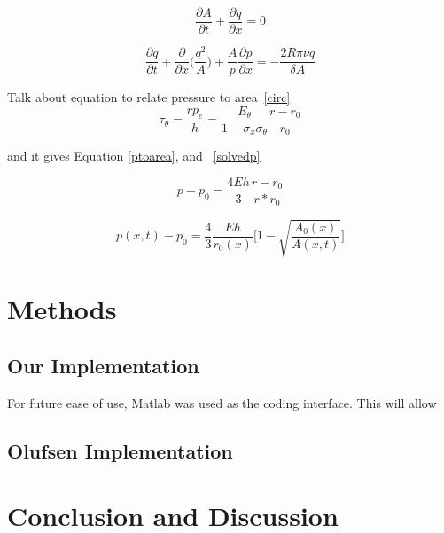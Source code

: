 \documentclass[12pt]{article}
\newcommand{\partder}[2]{\frac{\partial #1}{\partial #2}}
\begin{document}
\begin{equation}
	\label{continuity}
	\partder{A}{t} + \partder{q}{x} = 0
\end{equation}

\begin{equation}
	\label{consxmomentum}
	\partder{q}{t} + \partder{}{x}\Bigg(\frac{q^2}{A}\Bigg) + \frac{A}{p}\partder{p}{x} = -\frac{2R\pi \nu q}{\delta A}
\end{equation}

Talk about equation to relate pressure to area~\eqref{circ}
\begin{equation}
	\label{circ}
	\tau_\theta = \frac{r p_e}{h} = \frac{E_\theta}{1-\sigma_x\sigma_\theta}\frac{r-r_0}{r_0}
\end{equation}

and it gives Equation \eqref{ptoarea}, and ~\eqref{solvedp}

\begin{equation}
	\label{ptoarea}
	p-p_0 = \frac{4Eh}{3} \frac{r-r_0}{r*r_0}
\end{equation} 


\begin{equation}
	p(x,t) - p_0 = \frac{4}{3} \frac{Eh}{r_0(x)} \Bigg[1 - \sqrt{\frac{A_0(x)}{A(x,t)}}\Bigg]
	\label{solvedp}
\end{equation}

\section{Methods}
\subsection{Our Implementation}
For future ease of use, Matlab was used as the coding interface. This will allow

\subsection{Olufsen Implementation}

\section{Conclusion and Discussion}



\end{document}
